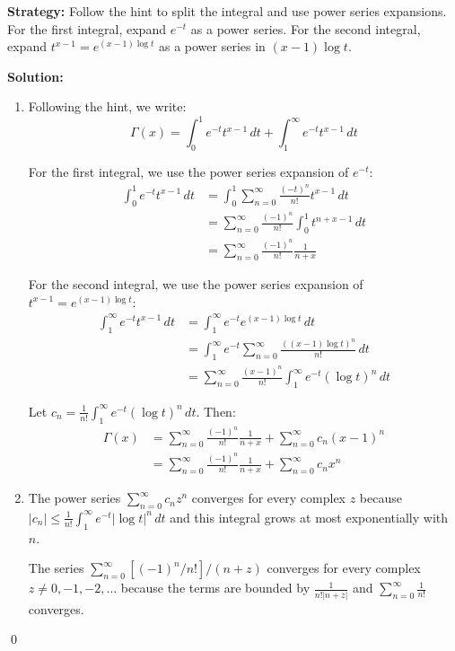 \noindent\textbf{Strategy:} Follow the hint to split the integral and use power series expansions. For the first integral, expand $e^{-t}$ as a power series. For the second integral, expand $t^{x-1} = e^{(x-1)\log t}$ as a power series in $(x-1)\log t$.

\bigskip\noindent\textbf{Solution:}
\begin{enumerate}[label=(\alph*)]
\item Following the hint, we write:
\[\Gamma(x) = \int_0^1 e^{-t} t^{x-1} \, dt + \int_1^\infty e^{-t} t^{x-1} \, dt\]

For the first integral, we use the power series expansion of $e^{-t}$:
\begin{align*}
\int_0^1 e^{-t} t^{x-1} \, dt &= \int_0^1 \sum_{n=0}^{\infty} \frac{(-t)^n}{n!} t^{x-1} \, dt \\
&= \sum_{n=0}^{\infty} \frac{(-1)^n}{n!} \int_0^1 t^{n+x-1} \, dt \\
&= \sum_{n=0}^{\infty} \frac{(-1)^n}{n!} \frac{1}{n + x}
\end{align*}

For the second integral, we use the power series expansion of $t^{x-1} = e^{(x-1)\log t}$:
\begin{align*}
\int_1^\infty e^{-t} t^{x-1} \, dt &= \int_1^\infty e^{-t} e^{(x-1)\log t} \, dt \\
&= \int_1^\infty e^{-t} \sum_{n=0}^{\infty} \frac{((x-1)\log t)^n}{n!} \, dt \\
&= \sum_{n=0}^{\infty} \frac{(x-1)^n}{n!} \int_1^\infty e^{-t} (\log t)^n \, dt
\end{align*}

Let $c_n = \frac{1}{n!} \int_1^\infty e^{-t} (\log t)^n \, dt$. Then:
\begin{align*}
\Gamma(x) &= \sum_{n=0}^{\infty} \frac{(-1)^n}{n!} \frac{1}{n + x} + \sum_{n=0}^{\infty} c_n (x-1)^n \\
&= \sum_{n=0}^{\infty} \frac{(-1)^n}{n!} \frac{1}{n + x} + \sum_{n=0}^{\infty} c_n x^n
\end{align*}

\item The power series $\sum_{n=0}^{\infty} c_n z^n$ converges for every complex $z$ because $|c_n| \leq \frac{1}{n!} \int_1^\infty e^{-t} |\log t|^n \, dt$ and this integral grows at most exponentially with $n$.

The series $\sum_{n=0}^{\infty} [(-1)^n / n!]/(n + z)$ converges for every complex $z \neq 0, -1, -2, \ldots$ because the terms are bounded by $\frac{1}{n! |n + z|}$ and $\sum_{n=0}^{\infty} \frac{1}{n!}$ converges.
\end{enumerate}\qed


